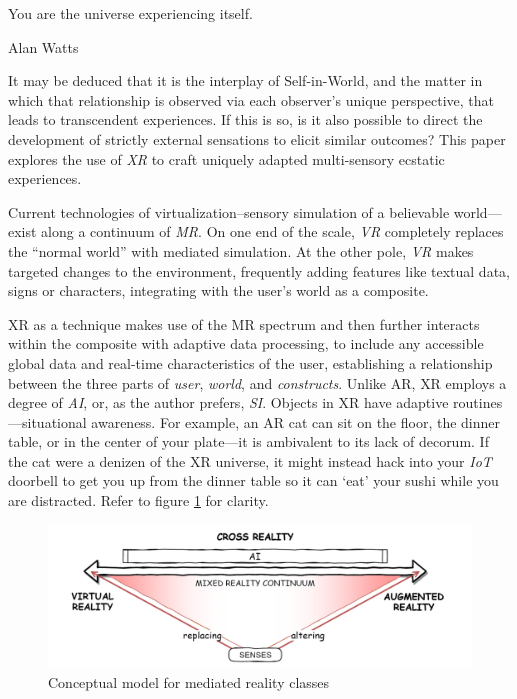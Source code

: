 \documentclass{UIdahoMastersThesis}
\begin{document}
\label{Chapter:CrossingReality}
\epigraph {You are the universe experiencing itself.}{Alan Watts}

\vspace{9mm}

It may be deduced that it is the interplay of Self-in-World, and the matter in which that relationship is observed via each observer's unique perspective, that leads to transcendent experiences. If this is so, is it also possible to direct the development of strictly external sensations to elicit similar outcomes? This paper explores the use of \textit{\ac{XR}} to craft uniquely adapted multi-sensory ecstatic experiences.

Current technologies of virtualization--sensory simulation of a believable world---exist along a continuum of \textit{\ac{MR}}. On one end of the scale, \textit{\ac{VR}} completely replaces the ``normal world'' with mediated simulation. At the other pole, \textit{\ac{VR}} makes targeted changes to the environment, frequently adding features like textual data, signs or characters, integrating with the user's world as a composite. 

\ac{XR} as a technique makes use of the \ac{MR} spectrum and then further interacts within the composite with adaptive data processing, to include any accessible global data and real-time characteristics of the user, establishing a relationship between the three parts of \emph{user}, \emph{world}, and \emph{constructs}. Unlike \ac{AR}, \ac{XR} employs a degree of \textit{\ac{AI}}, or, as the author prefers, \textit{\ac{SI}}. Objects in XR have adaptive routines---situational awareness. For example, an AR cat can sit on the floor, the dinner table, or in the center of your plate---it is ambivalent to its lack of decorum. If the cat were a denizen of the \ac{XR} universe, it might instead hack into your \textit{\ac{IoT}} doorbell to get you up from the dinner table so it can `eat' your sushi while you are distracted. Refer to figure \ref{fig:mr} for clarity.


\begin{figure}[h!]
	\centering
	\includegraphics[width=.81\linewidth]{mr.png}
	\caption{Conceptual model for mediated reality classes}
	\label{fig:mr}
\end{figure}
\end{document}
